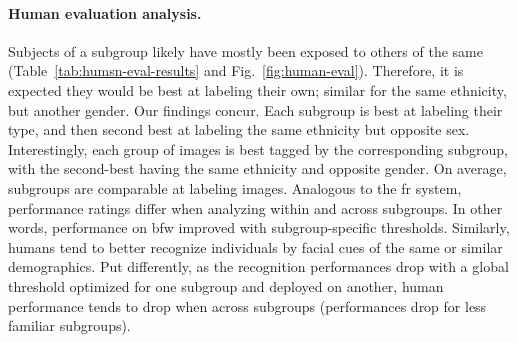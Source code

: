 \vspace{-5mm}
\noindent\paragraph{Human evaluation analysis.}
Subjects of a subgroup likely have mostly been exposed to others of the same (Table~\ref{tab:humsn-eval-results} and Fig.~\ref{fig:human-eval}). Therefore, it is expected they would be best at labeling their own; similar for the same ethnicity, but another gender. Our findings concur. Each subgroup is best at labeling their type, and then second best at labeling the same ethnicity but opposite sex. Interestingly, each group of images is best tagged by the corresponding subgroup, with the second-best having the same ethnicity and opposite gender. On average, subgroups are comparable at labeling images. Analogous to the \gls{fr} system, performance ratings differ when analyzing within and across subgroups. In other words, performance on \gls{bfw} improved with subgroup-specific thresholds. Similarly, humans tend to better recognize individuals by facial cues of the same or similar demographics. Put differently, as the recognition performances drop with a global threshold optimized for one subgroup and deployed on another, human performance tends to drop when across subgroups (\ie performances drop for less familiar subgroups).
 